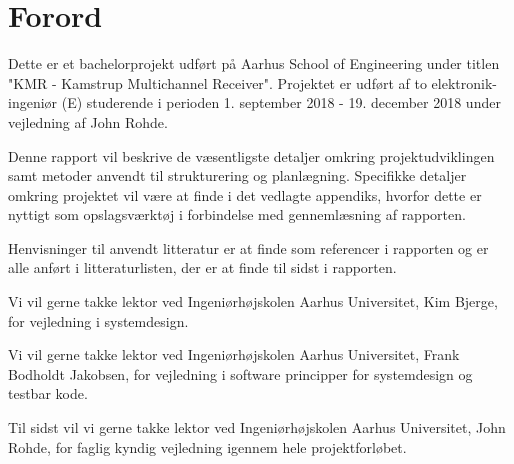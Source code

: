 \chapter*{Forord} 

Dette er et bachelorprojekt udført på Aarhus School of Engineering under titlen "KMR - Kamstrup Multichannel Receiver". Projektet er udført af to elektronik-ingeniør (E) studerende i perioden 1. september 2018 - 19. december 2018 under vejledning af John Rohde. 

Denne rapport vil beskrive de væsentligste detaljer omkring projektudviklingen samt metoder anvendt til strukturering og planlægning. Specifikke detaljer omkring projektet vil være at finde i det vedlagte appendiks, hvorfor dette er nyttigt som opslagsværktøj i forbindelse med gennemlæsning af rapporten. 

Henvisninger til anvendt litteratur er at finde som referencer i rapporten og er alle anført i litteraturlisten, der er at finde til sidst i rapporten. 

Vi vil gerne takke lektor ved Ingeniørhøjskolen Aarhus Universitet, Kim Bjerge, for vejledning i systemdesign.

Vi vil gerne takke lektor ved Ingeniørhøjskolen Aarhus Universitet, Frank Bodholdt Jakobsen, for vejledning i software principper for systemdesign og testbar kode. 

Til sidst vil vi gerne takke lektor ved Ingeniørhøjskolen Aarhus Universitet, John Rohde, for faglig kyndig vejledning igennem hele projektforløbet. 
